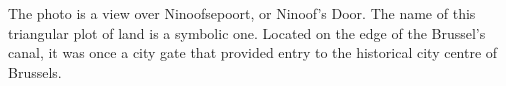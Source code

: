 \documentclass{article}[11pt]
\begin{document}
 %

The photo is a view over Ninoofsepoort, or Ninoof's Door. The name of this triangular plot of land is a symbolic one. Located on the edge of the Brussel's canal, it was once a city gate that provided entry to the historical city centre of Brussels. 
\end{document}
